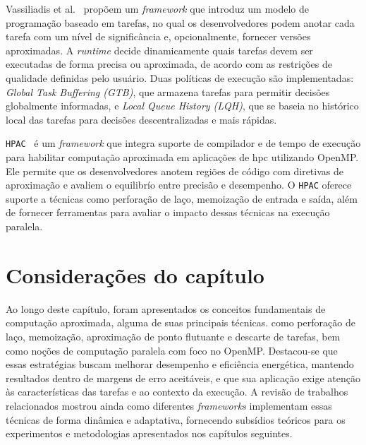 Vassiliadis et al.~\cite{vassiliadis2015} propõem um \textit{framework} que introduz um modelo de programação baseado em tarefas, no qual os desenvolvedores podem anotar cada tarefa com um nível de significância e, opcionalmente, fornecer versões aproximadas. A \textit{runtime} decide dinamicamente quais tarefas devem ser executadas de forma precisa ou aproximada, de acordo com as restrições de qualidade definidas pelo usuário. Duas políticas de execução são implementadas: \textit{Global Task Buffering (GTB)}, que armazena tarefas para permitir decisões globalmente informadas, e \textit{Local Queue History (LQH)}, que se baseia no histórico local das tarefas para decisões descentralizadas e mais rápidas.

\texttt{HPAC}~\cite{parasyris2021} é um \textit{framework} que integra suporte de compilador e de tempo de execução para habilitar computação aproximada em aplicações de \gls{hpc} utilizando OpenMP. Ele permite que os desenvolvedores anotem regiões de código com diretivas de aproximação e avaliem o equilibrío entre precisão e desempenho. O \texttt{HPAC} oferece suporte a técnicas como perforação de laço, memoização de entrada e saída, além de fornecer ferramentas para avaliar o impacto dessas técnicas na execução paralela.

\section{Considerações do capítulo}

Ao longo deste capítulo, foram apresentados os conceitos fundamentais de computação aproximada, alguma de suas principais técnicas. como perforação de laço, memoização, aproximação de ponto flutuante e descarte de tarefas, bem como noções de computação paralela com foco no OpenMP. Destacou-se que essas estratégias buscam melhorar desempenho e eficiência energética, mantendo resultados dentro de margens de erro aceitáveis, e que sua aplicação exige atenção às características das tarefas e ao contexto da execução. A revisão de trabalhos relacionados mostrou ainda como diferentes \textit{frameworks} implementam essas técnicas de forma dinâmica e adaptativa, fornecendo subsídios teóricos para os experimentos e metodologias apresentados nos capítulos seguintes.

